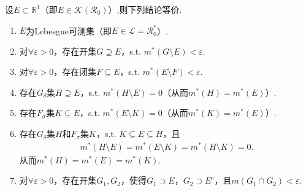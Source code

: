 \documentclass[../../main.tex]{subfiles}%
\begin{document}
\begin{theorem}[Lebesgue可测集的充要条件]\label{theorem:Lebesgue可测集的充要条件}
设$E\subset\mathbb{R}^1$（即$E\in\mathscr{K}(\mathscr{R}_0)$）,则下列结论等价.
\begin{enumerate}[(1)]
\item\label{theorem:Lebesgue可测集的充要条件-1} $E$为Lebesgue可测集（即$E\in\mathscr{L}=\mathscr{R}_0^*$）.

\item\label{theorem:Lebesgue可测集的充要条件-2}  对$\forall\varepsilon>0$，存在开集$G\supseteq E$，s.t. $m^*(G\setminus E)<\varepsilon$.

\item\label{theorem:Lebesgue可测集的充要条件-3}  对$\forall\varepsilon>0$，存在闭集$F\subseteq E$，s.t. $m^*(E\setminus F)<\varepsilon$.

\item\label{theorem:Lebesgue可测集的充要条件-4}  存在$G_\delta$集$H\supseteq E$，s.t. $m^*(H\setminus E)=0$（从而$m^*(H)=m^*(E)$）.

\item\label{theorem:Lebesgue可测集的充要条件-5}  存在$F_\sigma$集$K\subseteq E$，s.t. $m^*(E\setminus K)=0$（从而$m^*(K)=m^*(E)$）.

\item\label{theorem:Lebesgue可测集的充要条件-6}  存在$G_\delta$集$H$和$F_\sigma$集$K$，s.t. $K\subseteq E\subseteq H$，且
\begin{align*}
m^*(H\setminus E) = m^*(E\setminus K) = m^*(H\setminus K) = 0.
\end{align*}
从而$m^*(H)=m^*(E)=m^*(K)$.

\item\label{theorem:Lebesgue可测集的充要条件-7} 对$\forall\varepsilon>0$，存在开集$G_1,G_2$，使得$G_1\supset E$，$G_2\supset E^c$，且$m(G_1\cap G_2)<\varepsilon$.
\end{enumerate}
\end{theorem}
\end{document}

